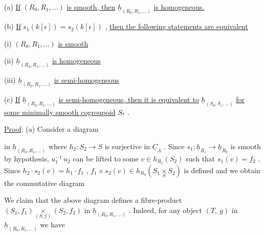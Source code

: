(a)  \underline{If}  $(R_0,R_1,\ldots)$  \underline{is smooth, then}  $\underline{h}_{(R_0,R_1,\ldots)}$  \underline{is homogeneous.}

(b)  \underline{If}  $s_1(k[\epsilon]) = s_2(k[\epsilon])$  , \underline{then the following statements are equivalent}

          (i)  $(R_0,R_1,\ldots)$  \underline{is smooth}

         (ii)  $\underline{h}_{(R_0,R_1,\ldots)}$  \underline{is homogeneous}

        (iii)  $\underline{h}_{(R_0,R_1,\ldots)}$  \underline{is semi-homogeneous}



(c)  \underline{If}  $\underline{h}_{(R_0,R_1,\ldots)}$  \underline{is semi-homogeneous, then it is equivalent to}  $\underline{h}_{(S_0,S_1,\ldots)}$  \underline{for some minimally smooth cogroupoid}  $S_*$  .

\underline{Proof}:   (a)  Consider a diagram

\begin{center}
\end{center}
in  $\underline{h}_{(R_0,R_1,\ldots)}$  where  $h_2 : S_2 \longrightarrow S$  is surjective in  $\underline{C}_\Lambda$ . Since $s_1 : \underline{h}_{R_1} \longrightarrow \underline{h}_{R_0}$  is smooth by hypothesis,  $u_1^{-1}\, u_2$  can be lifted to some $v \in h_{R_1}(S_2)$  such that  $s_1(v) = f_2$ . Since  $h_2 \cdot s_2(v) = h_1 \cdot f_1$ , $f_1 \times s_2(v) \in h_{R_0}(S_1 \underset{S}{\times} S_2)$  is defined and we obtain the commutative diagram

\begin{center}
\end{center}
We claim that the above diagram defines a fibre-product  $(S_1,f_1) \underset{(S,f)}{\times} (S_2,f_2)$  in $\underline{h}_{(R_0,R_1,\ldots)}$ . Indeed, for any object  $(T,\ g)$  in  $\underline{h}_{(R_0,R_1,\ldots)}$  we have

